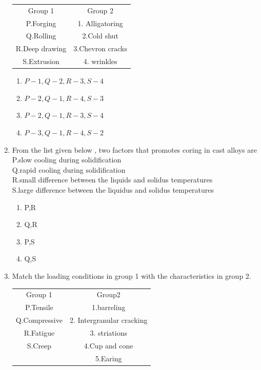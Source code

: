 \documentclass[journal]{IEEEtran}
\theoremstyle{remark}
\begin{document}
\begin{enumerate}
\begin{center}
\begin{tabular}{c c}
Group 1 & Group 2 \\ 
P.Forging & 1. Alligatoring\\
Q.Rolling & 2.Cold shut\\
R.Deep drawing & 3.Chevron cracks\\
S.Extrusion &  4. wrinkles
\end{tabular}
\end{center}
\begin{multicols}{2}
\begin{enumerate}
    \item$ P-1,Q-2,R-3,S-4$
    \item$P-2,Q-1,R-4,S-3$
    \item $P-2,Q-1,R-3,S-4$
    \item $P-3,Q-1,R-4,S-2$
\end{enumerate}
\end{multicols}
\item From the list given below , two factors that promotes coring in cast alloys are                \hfill{}\\
P.slow cooling during solidification \\
Q.rapid cooling during solidification\\
R.small difference between the liquids and solidus temperatures\\
S.large difference between the liquidus and solidus temperatures
\begin{multicols}{4}
\begin{enumerate}
    \item P,R
    \item Q,R
    \item P,S
    \item Q,S
\end{enumerate}
\end{multicols}
\item Match the loading conditions in group 1 with the characteristics in group 2.\hfill{}
\begin{center}
\begin{tabular}{c c}
Group 1     &Group2  \\
P.Tensile     &1.barreling\\
Q.Compressive &2. Intergranular cracking\\
R.Fatigue &3. striations\\
S.Creep &4.Cup and cone\\
       &5.Earing
\end{tabular}
\end{center}

\end{enumerate}
\end{document}
